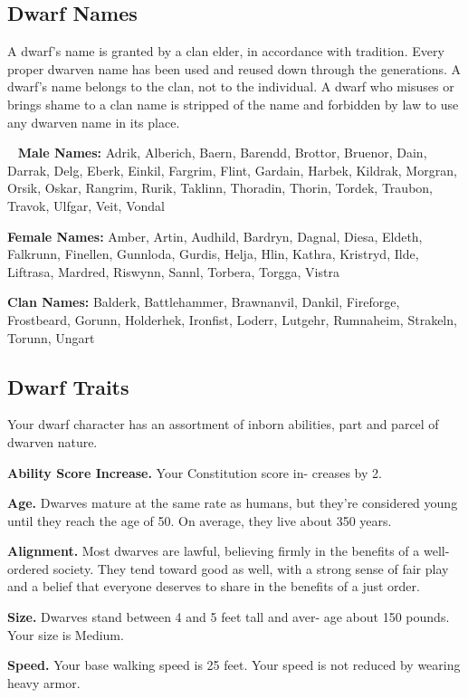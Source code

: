 \subsection{Dwarf Names}
A dwarf’s name is granted by a clan elder, in accordance with tradition. Every proper dwarven name has been used and reused down through the generations. A dwarf’s name belongs to the clan, not to the individual. A dwarf who misuses or brings shame to a clan name is stripped of the name and forbidden by law to use any dwarven name in its place.

\ \newline
\noindent \textbf{Male Names:} \hangindent=0.3cm Adrik, Alberich, Baern, Barendd, Brottor, Bruenor, Dain, Darrak, Delg, Eberk, Einkil, Fargrim, Flint, Gardain, Harbek, Kildrak, Morgran, Orsik, Oskar, Rangrim, Rurik, Taklinn, Thoradin, Thorin, Tordek, Traubon, Travok, Ulfgar, Veit, Vondal

\noindent \textbf{Female Names:} \hangindent=0.3cm Amber, Artin, Audhild, Bardryn, Dagnal, Diesa, Eldeth, Falkrunn, Finellen, Gunnloda, Gurdis, Helja, Hlin, Kathra, Kristryd, Ilde, Liftrasa, Mardred, Riswynn, Sannl, Torbera, Torgga, Vistra

\noindent \textbf{Clan Names:} \hangindent=0.3cm Balderk, Battlehammer, Brawnanvil, Dankil, Fireforge, Frostbeard, Gorunn, Holderhek, Ironfist, Loderr, Lutgehr, Rumnaheim, Strakeln, Torunn, Ungart

\subsection{Dwarf Traits}
Your dwarf character has an assortment of inborn abilities, part and parcel of dwarven nature.

\textbf{Ability Score Increase.} Your Constitution score in- creases by 2.

\textbf{Age.} Dwarves mature at the same rate as humans, but they’re considered young until they reach the age of 50. On average, they live about 350 years.

\textbf{Alignment.} Most dwarves are lawful, believing firmly in the benefits of a well-ordered society. They tend toward good as well, with a strong sense of fair play and a belief that everyone deserves to share in the benefits of a just order.

\textbf{Size.} Dwarves stand between 4 and 5 feet tall and aver- age about 150 pounds. Your size is Medium.

\textbf{Speed.} Your base walking speed is 25 feet. Your speed is not reduced by wearing heavy armor.

